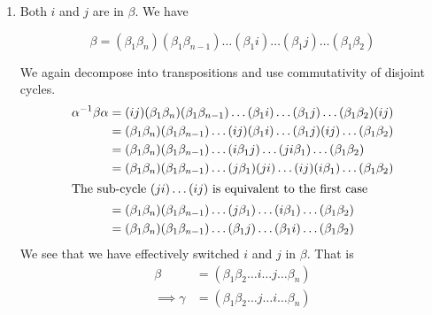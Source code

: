 \documentclass[12pt]{article}
\begin{document}
\begin{enumerate}
\item Both $i$ and $j$ are in $\beta$. We have

\[
\beta = (\beta_1 \beta_n)(\beta_1 \beta_{n - 1})\ldots(\beta_1 i)\ldots(\beta_1 j)\ldots(\beta_1 \beta_2)
\]

We again decompose into transpositions and use commutativity of disjoint cycles.
\begin{align*}
\alpha^{-1}\beta \alpha &= (ij)(\beta_1 \beta_n)(\beta_1 \beta_{n - 1})\ldots(\beta_1 i)\ldots(\beta_1 j)\ldots(\beta_1 \beta_2)(ij)\\
&= (\beta_1 \beta_n)(\beta_1 \beta_{n - 1})\ldots(ij)(\beta_1 i) \ldots(\beta_1 j)(ij)\ldots(\beta_1 \beta_2)\\
&= (\beta_1 \beta_n)(\beta_1 \beta_{n - 1})\ldots(i\beta_1 j) \ldots(j i \beta_1)\ldots(\beta_1 \beta_2)\\
&= (\beta_1 \beta_n)(\beta_1 \beta_{n - 1})\ldots(j \beta_1)(j i) \ldots(ij)(i \beta_1)\ldots(\beta_1 \beta_2)\\
\shortintertext{The sub-cycle $(j i) \ldots (ij)$ is equivalent to the first case}
&= (\beta_1 \beta_n)(\beta_1 \beta_{n - 1})\ldots(j \beta_1)\ldots(i \beta_1)\ldots(\beta_1 \beta_2)\\
&= (\beta_1 \beta_n)(\beta_1 \beta_{n - 1})\ldots(\beta_1 j)\ldots(\beta_1 i)\ldots(\beta_1 \beta_2)\\
\end{align*}
We see that we have effectively switched $i$ and $j$ in $\beta$. That is
\begin{align*}
\beta &= (\beta_1 \beta_2 \ldots i\ldots j\ldots \beta_n)\\
\implies \gamma &= (\beta_1 \beta_2 \ldots j\ldots i\ldots \beta_n)
\end{align*}


\end{enumerate}
\end{document}
